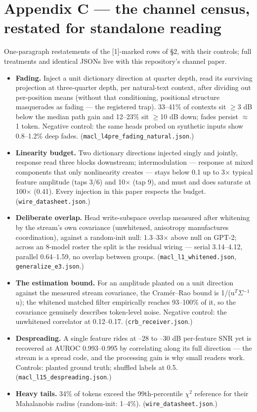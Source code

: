 \documentclass[10pt]{article}
\begin{document}
\section{Appendix C --- the channel census, restated for standalone reading}

One-paragraph restatements of the [1]-marked rows of §2, with their controls; full treatments and
identical JSONs live with this repository's channel paper.

\begin{itemize}\setlength\itemsep{1pt}
\item \textbf{Fading.} Inject a unit dictionary direction at quarter depth, read its surviving projection at three-quarter depth, per natural-text context, after dividing out per-position means (without that conditioning, positional structure masquerades as fading --- the registered trap). 33--41\% of contexts sit $\ge$3 dB below the median path gain and 12--23\% sit $\ge$10 dB down; fades persist $\approx$1 token. Negative control: the same heads probed on synthetic inputs show 0.8--1.2\% deep fades. (\texttt{macl\_l4pre\_fading\_natural.json}.)
\item \textbf{Linearity budget.} Two dictionary directions injected singly and jointly, response read three blocks downstream; intermodulation --- response at mixed components that only nonlinearity creates --- stays below 0.1 up to 3$\times$ typical feature amplitude (taps 3/6) and 10$\times$ (tap 9), and must and does saturate at 100$\times$ (0.41). Every injection in this paper respects the budget. (\texttt{wire\_datasheet.json}.)
\item \textbf{Deliberate overlap.} Head write-subspace overlap measured after whitening by the stream's own covariance (unwhitened, anisotropy manufactures coordination), against a random-init null: 1.3--33$\times$ above null on GPT-2; across an 8-model roster the split is the residual wiring --- serial 3.14--4.12, parallel 0.64--1.59, no overlap between groups. (\texttt{macl\_l1\_whitened.json}, \texttt{generalize\_e3.json}.)
\item \textbf{The estimation bound.} For an amplitude planted on a unit direction against the measured stream covariance, the Cramér--Rao bound is 1/(u$^{T}$$\Sigma$$^{-1}$u); the whitened matched filter empirically reaches 93--100\% of it, so the covariance genuinely describes token-level noise. Negative control: the unwhitened correlator at 0.12--0.17. (\texttt{crb\_receiver.json}.)
\item \textbf{Despreading.} A single feature rides at --28 to --30 dB per-feature SNR yet is recovered at AUROC 0.993--0.995 by correlating along its full direction --- the stream is a spread code, and the processing gain is why small readers work. Controls: planted ground truth; shuffled labels at 0.5. (\texttt{macl\_l15\_despreading.json}.)
\item \textbf{Heavy tails.} 34\% of tokens exceed the 99th-percentile $\chi$$^{2}$ reference for their Mahalanobis radius (random-init: 1--4\%). (\texttt{wire\_datasheet.json}.)
\end{itemize}
\end{document}
